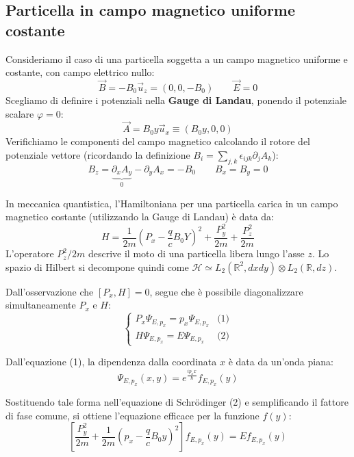 \subsection{Particella in campo magnetico uniforme costante}

Consideriamo il caso di una particella soggetta a un campo magnetico uniforme e costante, con campo elettrico nullo:
\begin{equation}
    \vec{B} = - B_0 \vec{u}_z = (0, 0, -B_0) \qquad \vec{E} = 0
\end{equation}
Scegliamo di definire i potenziali nella \textbf{Gauge di Landau}, ponendo il potenziale scalare \(\varphi=0\):
\begin{equation}
    \vec{A} = B_0 y \vec{u}_x \equiv (B_0 y, 0, 0)
\end{equation}
Verifichiamo le componenti del campo magnetico calcolando il rotore del potenziale vettore (ricordando la definizione \(B_i = \sum_{j,k} \epsilon_{ijk} \partial_j A_k\)):
\[
    B_z = \underbrace{\partial_x A_y}_{0} - \partial_y A_x = - B_0 \qquad
    B_x = B_y = 0
\]

In meccanica quantistica, l'Hamiltoniana per una particella carica in un campo magnetico costante (utilizzando la Gauge di Landau) è data da:
\[
    H = \frac{1}{2m} \left( P_x - \frac{q}{c} B_0 Y \right)^2 + \frac{P_y^2}{2m} + \frac{P_z^2}{2m}
\]
L'operatore \(P_z^2/2m\) descrive il moto di una particella libera lungo l'asse \(z\). Lo spazio di Hilbert si decompone quindi come \(\mathcal{H} \simeq L_2(\mathbb{R}^2, dx dy) \otimes L_2(\mathbb{R}, dz)\).

Dall'osservazione che \([P_x, H] = 0\), segue che è possibile diagonalizzare simultaneamente \(P_x\) e \(H\):
\[
    \begin{cases}
        P_x \Psi_{E, p_x} = p_x \Psi_{E, p_x} & \text{(1)} \\
        H \Psi_{E, p_x} = E \Psi_{E, p_x} & \text{(2)}
    \end{cases}
\]

Dall'equazione (1), la dipendenza dalla coordinata \(x\) è data da un'onda piana:
\[
    \Psi_{E, p_x}(x, y) = e^{\frac{i p_x x}{\hbar}} f_{E, p_x}(y)
\]

Sostituendo tale forma nell'equazione di Schrödinger (2) e semplificando il fattore di fase comune, si ottiene l'equazione efficace per la funzione \(f(y)\):
\[
    \left[ \frac{P_y^2}{2m} + \frac{1}{2m} \left( p_x - \frac{q}{c} B_0 y \right)^2 \right] f_{E, p_x}(y) = E f_{E, p_x}(y)
\]


